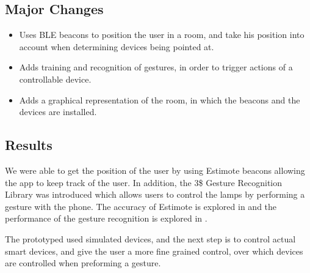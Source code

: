 \subsection{Major Changes}
\begin{itemize}
\item Uses BLE beacons to position the user in a room, and take his position into account when determining devices being pointed at.
\item Adds training and recognition of gestures, in order to trigger actions of a controllable device.
\item Adds a graphical representation of the room, in which the beacons and the devices are installed.
\end{itemize}

\subsection{Results}

We were able to get the position of the user by using Estimote beacons allowing the app to keep track of the user. In addition, the 3\$ Gesture Recognition Library was introduced which allows users to control the lamps by performing a gesture with the phone.
The accuracy of Estimote is explored in  and the performance of the gesture recognition is explored in .

The prototyped used simulated devices, 
and the next step is to control actual smart devices, 
and give the user a more fine grained control, 
over which devices are controlled when preforming a gesture.

